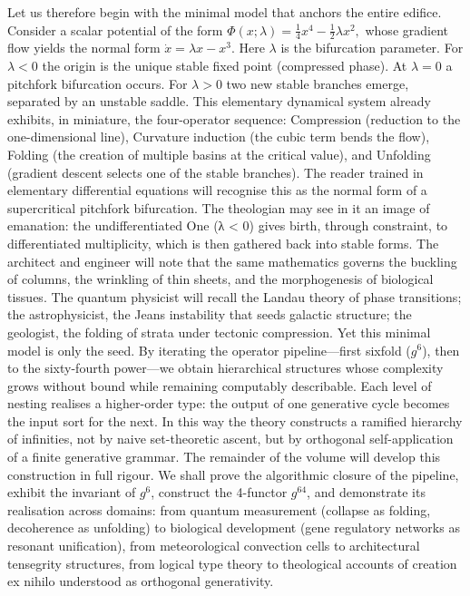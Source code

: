 Let us therefore begin with the minimal model that anchors the entire edifice. Consider a scalar potential of the form
$   \Phi(x; \lambda) = \frac{1}{4}x^4 - \frac{1}{2}\lambda x^2,   $
whose gradient flow yields the normal form
$   \dot{x} = \lambda x - x^3.   $
Here $  \lambda  $ is the bifurcation parameter. For $  \lambda < 0  $ the origin is the unique stable fixed point (compressed phase). At $  \lambda = 0  $ a pitchfork bifurcation occurs. For $  \lambda > 0  $ two new stable branches emerge, separated by an unstable saddle. This elementary dynamical system already exhibits, in miniature, the four-operator sequence: Compression (reduction to the one-dimensional line), Curvature induction (the cubic term bends the flow), Folding (the creation of multiple basins at the critical value), and Unfolding (gradient descent selects one of the stable branches).
The reader trained in elementary differential equations will recognise this as the normal form of a supercritical pitchfork bifurcation. The theologian may see in it an image of emanation: the undifferentiated One (λ < 0) gives birth, through constraint, to differentiated multiplicity, which is then gathered back into stable forms. The architect and engineer will note that the same mathematics governs the buckling of columns, the wrinkling of thin sheets, and the morphogenesis of biological tissues. The quantum physicist will recall the Landau theory of phase transitions; the astrophysicist, the Jeans instability that seeds galactic structure; the geologist, the folding of strata under tectonic compression.
Yet this minimal model is only the seed. By iterating the operator pipeline—first sixfold ($  g^6  $), then to the sixty-fourth power—we obtain hierarchical structures whose complexity grows without bound while remaining computably describable. Each level of nesting realises a higher-order type: the output of one generative cycle becomes the input sort for the next. In this way the theory constructs a ramified hierarchy of infinities, not by naive set-theoretic ascent, but by orthogonal self-application of a finite generative grammar.
The remainder of the volume will develop this construction in full rigour. We shall prove the algorithmic closure of the pipeline, exhibit the invariant of $  g^6  $, construct the 4-functor $  g^{64}  $, and demonstrate its realisation across domains: from quantum measurement (collapse as folding, decoherence as unfolding) to biological development (gene regulatory networks as resonant unification), from meteorological convection cells to architectural tensegrity structures, from logical type theory to theological accounts of creation ex nihilo understood as orthogonal generativity.
